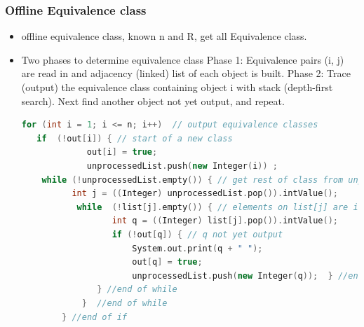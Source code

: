 \documentclass[a4paper,12pt,twoside]{book}
\begin{document}
\subsubsection{Offline Equivalence class}
\begin{itemize}
\item offline equivalence class, known n and R, get all Equivalence class.  
\item Two phases to determine equivalence class
Phase 1: Equivalence pairs (i, j) are read in and adjacency (linked) list of each object is built.
Phase 2: Trace (output) the equivalence class containing object i with stack (depth-first search). Next find another object not yet output, and repeat.

\begin{lstlisting}[frame=single, language=c++]
for (int i = 1; i <= n; i++)  // output equivalence classes
   if  (!out[i]) { // start of a new class
             out[i] = true;
             unprocessedList.push(new Integer(i)) ;
    while (!unprocessedList.empty()) { // get rest of class from unprocessedList
          int j = ((Integer) unprocessedList.pop()).intValue();
           while  (!list[j].empty()) { // elements on list[j] are in the same class
                  int q = ((Integer) list[j].pop()).intValue();
                  if (!out[q]) { // q not yet output
                      System.out.print(q + " ");
                      out[q] = true;
                      unprocessedList.push(new Integer(q));  } //end of if
               } //end of while
            }  //end of while 
        } //end of if

\end{lstlisting}


\end{itemize}
\end{document}
